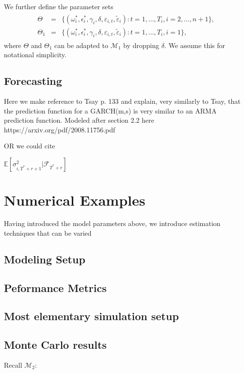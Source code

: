 \documentclass[11pt]{article}
\def\t#1{\tilde{#1}} %
\def\mc#1{\mathcal{#1}} %
\def\mc#1{\mathcal{#1}}
\theoremstyle{definition}
\begin{document}
We further define the parameter sets
\begin{align}
  \begin{array}{lll}
     \Theta &= &\{(\omega^{*}_i, \epsilon^{*}_i,\gamma_i, \delta,\varepsilon_{i,t},\t\varepsilon_{i})\colon t= 1, \ldots, T_i, i = 2, \ldots, n +1\},\\
    \Theta_1 &= &\{(\omega^{*}_i, \epsilon^{*}_i,\gamma_i, \delta,\varepsilon_{i,t},\t\varepsilon_{i})\colon t= 1, \ldots, T_i, i = 1\},\label{parameter}
  \end{array}
\end{align}
where $\Theta$ and $\Theta_1$ can be adapted to $\mc{M}_1$ by dropping $\delta$. We assume this for notational simplicity.

\subsection{Forecasting}

Here we make reference to Tsay p. 133 and explain, very similarly to Tsay, that the prediction function for a GARCH(m,s) is very similar to an ARMA prediction function.  Modeled after section 2.2 here https://arxiv.org/pdf/2008.11756.pdf


OR we could cite \citet{zivot2009practical}

$\mathbb{E}[ \sigma^{2}_{i,T^{*}+r+1} |\mathcal{F}_{T^{*}+r}]$

\section{Numerical Examples}

Having introduced the model parameters above, we introduce estimation techniques that can be varied

\subsection{Modeling Setup}

\subsection{Peformance Metrics}

\subsection{Most elementary simulation setup}

\subsection{Monte Carlo results}
Recall $\mc{M}_2$:
\end{document}

